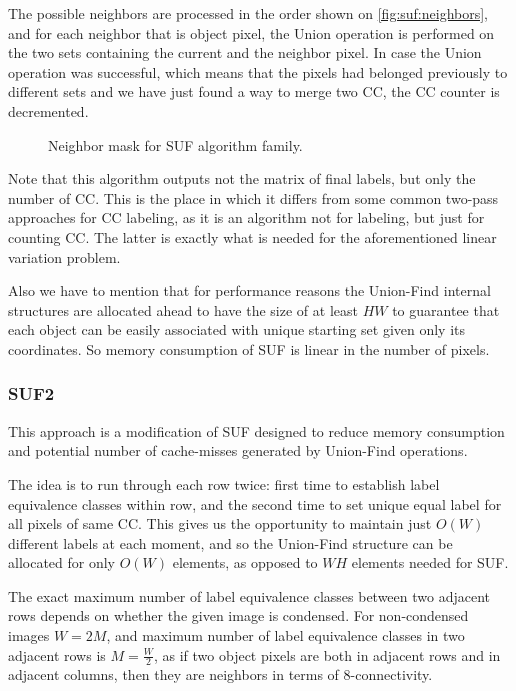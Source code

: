 \documentclass[hidelinks]{llncs}
\begin{document}
The possible neighbors are processed in the order shown on
\autoref{fig:suf:neighbors}, and for each neighbor that is object pixel, the
Union operation is performed on the two sets containing the current and the
neighbor pixel. In case the Union operation was successful, which means that
the pixels had belonged previously to different sets and we have just found a
way to merge two CC, the CC counter is decremented.

\begin{figure}
  \centering
  \caption{Neighbor mask for SUF algorithm family.}
  \label{fig:suf:neighbors}
\end{figure}

Note that this algorithm outputs not the matrix of final labels, but only the
number of CC. This is the place in which it differs from some common two-pass
approaches for CC %
labeling, as it is an algorithm not for labeling, but just for counting CC. The
latter is exactly what is needed for the aforementioned linear variation
problem.

Also we have to mention that for performance reasons the Union-Find internal
structures are allocated ahead to have the size of at least $HW$ to guarantee
that each object can be easily associated with unique starting set given only
its coordinates. So memory consumption of SUF is linear in the number of
pixels.

\subsubsection{SUF2}

This approach is a modification of SUF designed to reduce memory consumption
and potential number of cache-misses generated by Union-Find operations.

The idea is to run through each row twice: first time to establish label
equivalence classes within row, and the second time to set unique equal label
for all pixels of same CC. This gives us the opportunity to maintain just
$O(W)$ different labels at each moment, and so the Union-Find structure can be
allocated for only $O(W)$ elements, as opposed to $WH$ elements needed for SUF.

The exact maximum number of label equivalence classes between two adjacent rows
depends on whether the given image is condensed. For non-condensed images
$W=2M$, and maximum number of label equivalence classes in two adjacent rows is
$M=\frac{W}2$, as if two object pixels are both in adjacent rows and in
adjacent columns, then they are neighbors in terms of 8-connectivity.
\end{document}
